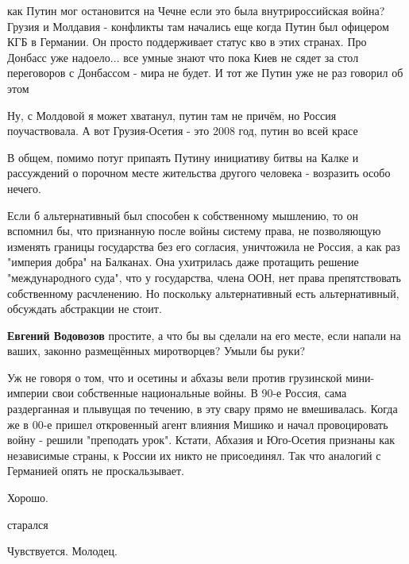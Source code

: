 \begin{itemize}
\begin{itemize}
как Путин мог остановится на Чечне если это была внутрироссийская война? Грузия
и Молдавия - конфликты там начались еще когда Путин был офицером КГБ в
Германии. Он просто поддерживает статус кво в этих странах. Про Донбасс уже
надоело... все умные знают что пока Киев не сядет за стол переговоров с
Донбассом - мира не будет. И тот же Путин уже не раз говорил об этом


Ну, с Молдовой я может хватанул, путин там не причём, но Россия поучаствовала.
А вот Грузия-Осетия - это 2008 год, путин во всей красе


В общем, помимо потуг припаять Путину инициативу битвы на Калке и рассуждений о
порочном месте жительства другого человека - возразить особо нечего.

Если б альтернативный был способен к собственному мышлению, то он вспомнил бы,
что признанную после войны систему права, не позволяющую изменять границы
государства без его согласия, уничтожила не Россия, а как раз "империя добра"
на Балканах. Она ухитрилась даже протащить решение "международного суда", что у
государства, члена ООН, нет права препятствовать собственному расчленению. Но
поскольку альтернативный есть альтернативный, обсуждать абстракции не стоит.

\textbf{Евгений Водовозов} простите, а что бы вы сделали на его месте, если напали на ваших, законно размещённых миротворцев? Умыли бы руки?


Уж не говоря о том, что и осетины и абхазы вели против грузинской мини-империи
свои собственные национальные войны. В 90-е Россия, сама раздерганная и
плывущая по течению, в эту свару прямо не вмешивалась. Когда же в 00-е пришел
откровенный агент влияния Мишико и начал провоцировать войну - решили
"преподать урок". Кстати, Абхазия и Юго-Осетия признаны как независимые страны,
к России их никто не присоединял. Так что аналогий с Германией опять не
проскальзывает.

\end{itemize} %

Хорошо.

\begin{itemize} %
старался

Чувствуется. Молодец.
\end{itemize} %


\end{itemize}
